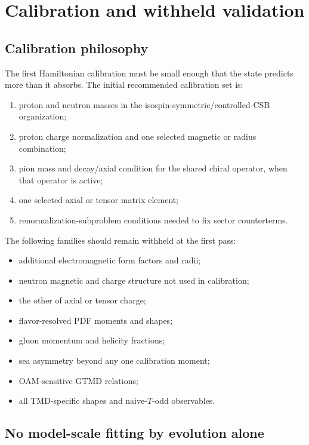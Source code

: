 \documentclass[11pt]{article}
\begin{document}
\section{Calibration and withheld validation}
\label{sec:calibration}

\subsection{Calibration philosophy}

The first Hamiltonian calibration must be small enough that the state predicts
more than it absorbs.  The initial recommended calibration set is:
\begin{enumerate}
 \item proton and neutron masses in the isospin-symmetric/controlled-CSB
 organization;
 \item proton charge normalization and one selected magnetic or radius
 combination;
 \item pion mass and decay/axial condition for the shared chiral operator, when
 that operator is active;
 \item one selected axial or tensor matrix element;
 \item renormalization-subproblem conditions needed to fix sector counterterms.
\end{enumerate}

The following families should remain withheld at the first pass:
\begin{itemize}
 \item additional electromagnetic form factors and radii;
 \item neutron magnetic and charge structure not used in calibration;
 \item the other of axial or tensor charge;
 \item flavor-resolved PDF moments and shapes;
 \item gluon momentum and helicity fractions;
 \item sea asymmetry beyond any one calibration moment;
 \item OAM-sensitive GTMD relations;
 \item all TMD-specific shapes and naive-\(T\)-odd observables.
\end{itemize}

\subsection{No model-scale fitting by evolution alone}
\end{document}
